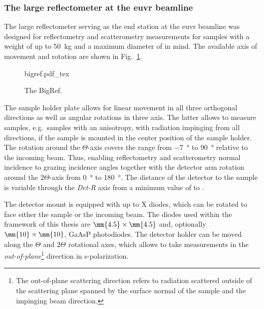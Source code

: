 \subsubsection{The large reflectometer at the \gls{euvr} beamline}
The large reflectometer serving as the end station at the \gls{euvr} beamline was designed for reflectometry and scatterometry measurements for samples with a weight of up to \SI{50}{\kg} and a maximum diameter of  in mind\cite{tummler_characterization_2003}. The available axis of movement and rotation are shown in Fig.~\ref{ch_exp:fig_bigref}.
\begin{figure}[htb]
    \def\svgwidth{\textwidth}
    {bigref.pdf_tex}
    \caption[The BigRef.]{The BigRef.}
    \label{ch_exp:fig_bigref}
\end{figure}
The sample holder plate allows for linear movement in all three orthogonal directions as well as angular rotations in three axis. The latter allows to measure samples, e.g.~samples with an anisotropy, with radiation impinging from all directions, if the sample is mounted in the center position of the sample holder. The rotation around the $\Theta$-axis covers the range from \SI{-7}{\degree} to \SI{90}{\degree} relative to the incoming beam. Thus, enabling reflectometry and scatterometry  normal incidence to grazing incidence angles together with the detector arm rotation around the $2\Theta$-axis from \SI{0}{\degree} to \SI{180}{\degree}. The distance of the detector to the sample is variable through the \emph{Det-R} axis from a minimum value of  to .

The detector mount is equipped with up to X  diodes, which can be rotated to face either the sample or the incoming beam. The diodes used within the framework of this thesis are $\mm{4.5} \times \mm{4.5}$ and, optionally $\mm{10} \times \mm{10}$, GaAsP photodiodes. The detector holder can be moved along the $\Theta$ and $2\Theta$ rotational axes, which allows to take measurements in the \emph{out-of-plane}\footnote{The out-of-plane scattering direction refers to radiation scattered outside of the scattering plane spanned by the surface normal of the sample and the impinging beam direction.} direction in s-polarization.

